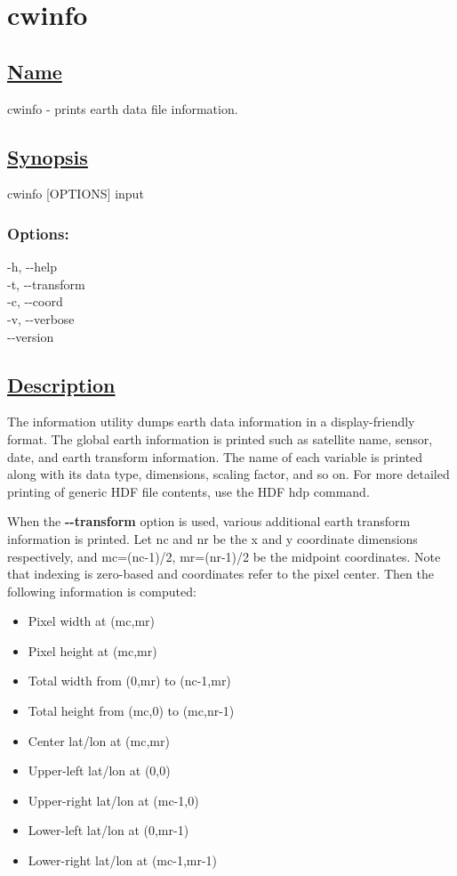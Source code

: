 \newpage
\section{cwinfo} \hypertarget{cwinfo}{}
\subsection*{\underline{Name}}


   cwinfo - prints earth data file information.  
\subsection*{\underline{Synopsis}}


  cwinfo [OPTIONS] input 
\subsubsection*{Options:}


  -h, -{-}help \\ 
 -t, -{-}transform \\ 
 -c, -{-}coord \\ 
 -v, -{-}verbose \\ 
 -{-}version \\ 

\subsection*{\underline{Description}}


  The information utility dumps earth data information in a display-friendly format. The global earth information is printed such as satellite name, sensor, date, and earth transform information. The name of each variable is printed along with its data type, dimensions, scaling factor, and so on. For more detailed printing of generic HDF file contents, use the HDF hdp command. 


 When the \textbf{-{-}transform}
 option is used, various additional earth transform information is printed. Let nc and nr be the x and y coordinate dimensions respectively, and mc=(nc-1)/2, mr=(nr-1)/2 be the midpoint coordinates. Note that indexing is zero-based and coordinates refer to the pixel center. Then the following information is computed: \begin{itemize}
\item Pixel width at (mc,mr)
\item Pixel height at (mc,mr)
\item Total width from (0,mr) to (nc-1,mr)
\item Total height from (mc,0) to (mc,nr-1)
\item Center lat/lon at (mc,mr)
\item Upper-left lat/lon at (0,0)
\item Upper-right lat/lon at (mc-1,0)
\item Lower-left lat/lon at (0,mr-1)
\item Lower-right lat/lon at (mc-1,mr-1)

\end{itemize}



